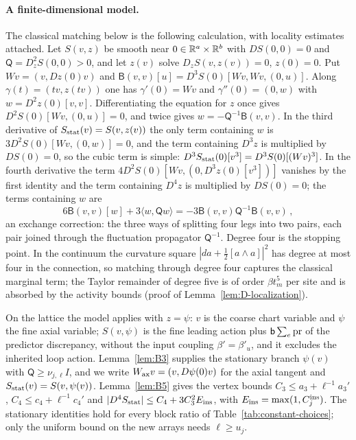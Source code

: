 \paragraph{A finite-dimensional model.} The classical matching below is the following calculation, with locality estimates attached. Let $S(v,z)$ be smooth near $0\in\mathbb{R}^a\times\mathbb{R}^b$ with $DS(0,0)=0$ and $\mathsf Q=D_z^2S(0,0)>0$, and let $z(v)$ solve $D_zS(v,z(v))=0$, $z(0)=0$. Put $Wv=(v,Dz(0)v)$ and $\mathsf B(v,v)[u]=D^3S(0)[Wv,Wv,(0,u)]$. Along $\gamma(t)=(tv,z(tv))$ one has $\gamma'(0)=Wv$ and $\gamma''(0)=(0,w)$ with $w=D^2z(0)[v,v]$. Differentiating the equation for $z$ once gives $D^2S(0)[Wv,(0,u)]=0$, and twice gives $w=-\mathsf Q^{-1}\mathsf B(v,v)$. In the third derivative of $S_{\rm stat}(v)=S(v,z(v))$ the only term containing $w$ is $3D^2S(0)[Wv,(0,w)]=0$, and the term containing $D^3z$ is multiplied by $DS(0)=0$, so the cubic term is simple: $D^3S_{\rm stat}(0)[v^3]=D^3S(0)[(Wv)^3]$. In the fourth derivative the term $4D^2S(0)[Wv,(0,D^3z(0)[v^3])]$ vanishes by the first identity and the term containing $D^4z$ is multiplied by $DS(0)=0$; the terms containing $w$ are
\begin{equation*}
6\mathsf B(v,v)[w]+3\langle w,\mathsf Qw\rangle=-3\mathsf B(v,v)\mathsf Q^{-1}\mathsf B(v,v)\,,
\end{equation*}
an exchange correction: the three ways of splitting four legs into two pairs, each pair joined through the fluctuation propagator $\mathsf Q^{-1}$. Degree four is the stopping point. In the continuum the curvature square $|da+\tfrac12[a\wedge a]|^2$ has degree at most four in the connection, so matching through degree four captures the classical marginal term; the Taylor remainder of degree five is of order $\beta t_m^5$ per site and is absorbed by the activity bounds (proof of Lemma~\ref{lem:D-localization}).

On the lattice the model applies with $z=\psi$: $v$ is the coarse chart variable and $\psi$ the fine axial variable; $S(v,\psi)$ is the fine leading action plus $\mathsf{b}\sum_e\operatorname{pr}$ of the predictor discrepancy, without the input coupling $\beta'=\beta'_u$, and it excludes the inherited loop action. Lemma~\ref{lem:B3} supplies the stationary branch $\psi(v)$ with $\mathsf Q\ge\nu_{j,\ell}I$, and we write $W_{\rm ax}v=(v,D\psi(0)v)$ for the axial tangent and $S_{\rm stat}(v)=S(v,\psi(v))$. Lemma~\ref{lem:B5} gives the vertex bounds $C_3\le a_3+\ell^{-1}a_3'$, $C_4\le c_4+\ell^{-1}c_4'$ and $|D^4S_{\rm stat}|\le C_4+3C_3^2E_{\rm ins}$, with $E_{\rm ins}=\max(1,C_j^{\rm ins})$. The stationary identities hold for every block ratio of Table~\ref{tab:constant-choices}; only the uniform bound on the new arrays needs $\ell\ge u_j$.

